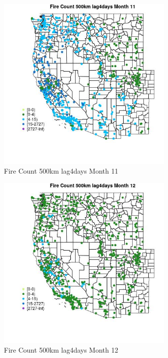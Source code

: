 \begin{figure} 
\centering  
\includegraphics[width=0.77\textwidth]{Code_Outputs/Report_ML_input_PM25_Step4_part_f_de_duplicated_aves_prioritize_24hr_obswNAs_MapObsMo11Fire_Count_500km_lag4days.jpg} 
\caption{\label{fig:Report_ML_input_PM25_Step4_part_f_de_duplicated_aves_prioritize_24hr_obswNAsMapObsMo11Fire_Count_500km_lag4days}Fire Count 500km lag4days Month 11} 
\end{figure} 
 

\begin{figure} 
\centering  
\includegraphics[width=0.77\textwidth]{Code_Outputs/Report_ML_input_PM25_Step4_part_f_de_duplicated_aves_prioritize_24hr_obswNAs_MapObsMo12Fire_Count_500km_lag4days.jpg} 
\caption{\label{fig:Report_ML_input_PM25_Step4_part_f_de_duplicated_aves_prioritize_24hr_obswNAsMapObsMo12Fire_Count_500km_lag4days}Fire Count 500km lag4days Month 12} 
\end{figure} 
 

